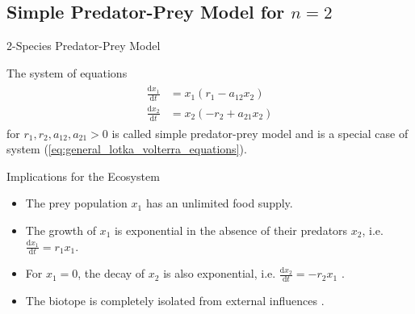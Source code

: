 \documentclass[10pt, dvipsnames]{beamer}
\begin{document}
\subsection[Simplified System]{Simple Predator-Prey Model for $n=2$}
\begin{frame}{2-Species Predator-Prey Model}

\begin{definition}
    The system of equations
    \begin{align}\label{eq:2d_simple_model}
    \begin{split}
        \frac{\mathrm{d}x_1}{\mathrm{d}t} &= x_1 (r_1 - a_{12}x_2) \\
        \frac{\mathrm{d}x_2}{\mathrm{d}t} &= x_2 (-r_2 + a_{21}x_2)
    \end{split}
    \end{align}
    for $r_1, r_2, a_{12}, a_{21} > 0$ is called simple predator-prey model and is a special case of system (\ref{eq:general_lotka_volterra_equations}).
\end{definition}

\end{frame}

\begin{frame}{Implications for the Ecosystem}

\begin{itemize}
    \item The prey population $x_1$ has an unlimited food supply.\pause
    \item The growth of $x_1$ is exponential in the absence of their predators $x_2$, i.e. $\frac{\mathrm{d}x_1}{\mathrm{d}t} = r_1 x_1$.\pause
    \item For $x_1 = 0$, the decay of $x_2$ is also exponential, i.e. $\frac{\mathrm{d}x_2}{\mathrm{d}t} = -r_2 x_1$ \cite[4 \psq]{predatorpreymodel}.\pause
    \item The biotope is completely isolated from external influences \cite[199]{theoryvsempiry}.
\end{itemize}
    
\end{frame}
\end{document}
